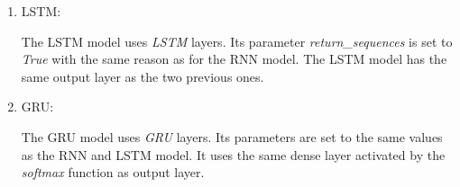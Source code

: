 \begin{enumerate}[label=\arabic*.]
  \item LSTM:
    
    The LSTM model uses \textit{LSTM} layers. Its parameter
    \textit{return\_sequences} is set to \textit{True} with the same reason as
    for the RNN model. The LSTM model has the same output layer as the two
    previous ones.\\
  \item GRU:
    
    The GRU model uses \textit{GRU} layers. Its parameters are set to the same
    values as the RNN and LSTM model. It uses the same dense layer activated by
    the \textit{softmax} function as output layer.
\end{enumerate}
